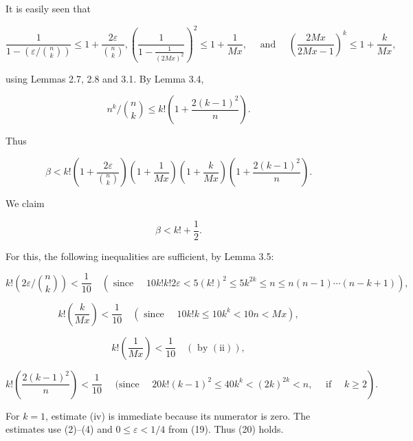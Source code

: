 \documentclass[10pt,letterpaper]{article}
\newcommand{\origpage}[1]{\marginnote{\footnotesize\textbf{[#1]}}}
\begin{document}
It is easily seen that

\[
\frac{1}{1-\left(\varepsilon /\binom{n}{k}\right)} \leq 1+\frac{2 \varepsilon}{\binom{n}{k}},\left(\frac{1}{1-\frac{1}{(2 M x)^{2}}}\right)^{2} \leq 1+\frac{1}{M x}, \quad \text { and } \quad\left(\frac{2 M x}{2 M x-1}\right)^{k} \leq 1+\frac{k}{M x},
\]

using \origpage{460}Lemmas 2.7, 2.8 and 3.1. By Lemma 3.4,

\[
n^{k} /\binom{n}{k} \leq k!\left(1+\frac{2(k-1)^{2}}{n}\right) .
\]

Thus

\[
\beta<k!\left(1+\frac{2 \varepsilon}{\binom{n}{k}}\right)\left(1+\frac{1}{M x}\right)\left(1+\frac{k}{M x}\right)\left(1+\frac{2(k-1)^{2}}{n}\right) .
\]

We claim


\begin{equation*}
\beta<k!+\frac{1}{2} . \tag{20}
\end{equation*}


For this, the following inequalities are sufficient, by Lemma 3.5:


\begin{equation*}
k!\left(2 \varepsilon /\binom{n}{k}\right)<\frac{1}{10} \quad\left(\text { since } \quad 10 k!k!2 \varepsilon<5(k!)^{2} \leq 5 k^{2 k} \leq n\leq n(n-1)\cdots(n-k+1)\right), \tag{i}
\end{equation*}



\begin{equation*}
k!\left(\frac{k}{M x}\right)<\frac{1}{10} \quad\left(\text { since } \quad 10 k!k \leq 10 k^{k}<10 n<M x\right), \tag{ii}
\end{equation*}



\begin{equation*}
k!\left(\frac{1}{M x}\right)<\frac{1}{10} \quad(\text { by }(\mathrm{ii})), \tag{iii}
\end{equation*}



\begin{equation*}
\left.k!\left(\frac{2(k-1)^{2}}{n}\right)<\frac{1}{10} \quad \text { (since } \quad 20 k!(k-1)^{2} \leq 40 k^{k}<(2 k)^{2 k}<n, \quad \text { if } \quad k \geq 2\right) . \tag{iv}
\end{equation*}


For $k=1$, estimate (iv) is immediate because its numerator is zero. The estimates use (2)--(4) and $0\leq\varepsilon<1/4$ from (19). Thus (20) holds.
\end{document}
